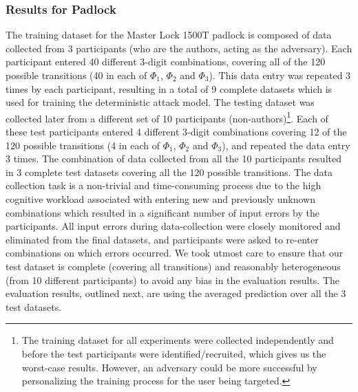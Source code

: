 \documentclass[]{IEEEtran}
\begin{document}
\subsubsection{\textbf{Results for Padlock}}
\label{padlockdeteval}
The training dataset for the Master Lock 1500T padlock is composed of data collected from 3 participants (who are the authors, acting as the adversary). Each participant entered 40 different 3-digit combinations, covering all of the 120 possible transitions (40 in each of $\Phi_{1}$, $\Phi_{2}$ and $\Phi_{3}$). This data entry was repeated 3 times by each participant, resulting in a total of 9 complete datasets which is used for training the deterministic attack model. The testing dataset was collected later from a different set of 10 participants (non-authors)\footnote{The training dataset for all experiments were collected independently and before the test participants were identified/recruited, which gives us the worst-case results. However, an adversary could be more successful by personalizing the training process for the user being targeted.}. Each of these test participants entered 4 different 3-digit combinations covering 12 of the 120 possible transitions (4 in each of $\Phi_{1}$, $\Phi_{2}$ and $\Phi_{3}$), and repeated the data entry 3 times. The combination of data collected from all the 10 participants resulted in 3 complete test datasets covering all the 120 possible transitions. The data collection task is a non-trivial and time-consuming process due to the high cognitive workload associated with entering new and previously unknown combinations which resulted in a significant number of input errors by the participants. All input errors during data-collection were closely monitored and eliminated from the final datasets, and participants were asked to re-enter combinations on which errors occurred. We took utmost care to ensure that our test dataset is complete (covering all transitions) and reasonably heterogeneous (from 10 different participants) to avoid any bias in the evaluation results. The evaluation results, outlined next, are using the averaged prediction over all the 3 test datasets.
\end{document}
